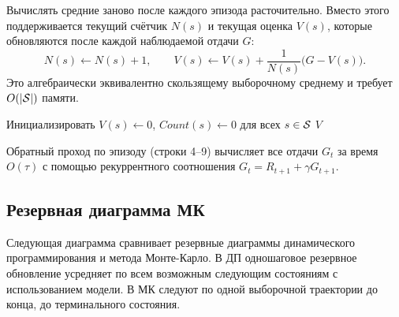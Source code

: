 Вычислять средние заново после каждого эпизода расточительно.  Вместо этого поддерживается текущий счётчик $N(s)$ и текущая оценка $V(s)$, которые обновляются после каждой наблюдаемой отдачи $G$:
\begin{equation}
  \label{eq:mc-incremental}
  N(s) \leftarrow N(s) + 1, \qquad
  V(s) \leftarrow V(s) + \frac{1}{N(s)}\bigl(G - V(s)\bigr).
\end{equation}
Это алгебраически эквивалентно скользящему выборочному среднему и требует $O(|\mathcal{S}|)$ памяти.

\begin{algorithm}[ht]
\caption{Предсказание методом МК по первому посещению}
\label{alg:fv-mc-prediction}
Инициализировать $V(s) \leftarrow 0$, $\mathit{Count}(s) \leftarrow 0$ для всех $s \in \mathcal{S}$\;
\Return $V$\;
\end{algorithm}

Обратный проход по эпизоду (строки 4--9) вычисляет все отдачи $G_t$ за время $O(\tau)$ с помощью рекуррентного соотношения $G_t = R_{t+1} + \gamma G_{t+1}$.

\subsection*{Резервная диаграмма МК}

Следующая диаграмма сравнивает резервные диаграммы динамического программирования и метода Монте-Карло.  В ДП одношаговое резервное обновление усредняет по всем возможным следующим состояниям с использованием модели.  В МК следуют по одной выборочной траектории до конца, до терминального состояния.

